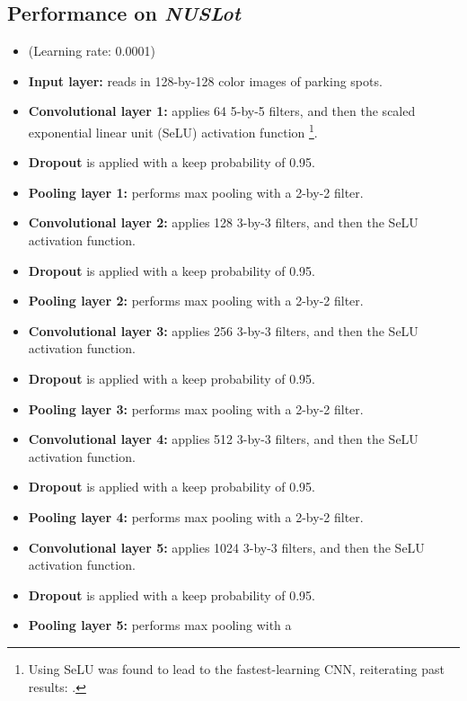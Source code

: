 \documentclass[a4paper, 11pt]{article} %
\begin{document}
	\subsection{Performance on \textit{NUSLot}}
		\begin{itemize}
			\setlength\itemsep{-3mm}
			\item[] (Learning rate: 0.0001)
			\item[] \textbf{Input layer:} reads in 128-by-128 color images of 
			parking spots.
			\item[] \textbf{Convolutional layer 1:} applies 64 5-by-5 filters, 
			and 
			then the 
			scaled exponential linear unit (SeLU) activation function 
			\footnote{Using SeLU was found to lead to the fastest-learning CNN, 
			reiterating past results: \cite{selu-motivation}\relax.}.
			\item[] \textbf{Dropout} is applied with a keep probability of 0.95.
			\item[] \textbf{Pooling layer 1:} performs max pooling with a 
			2-by-2 
			filter.
			\item[] \textbf{Convolutional layer 2:} applies 128 3-by-3 filters, 
			and 
			then the 
			SeLU activation function.
			\item[] \textbf{Dropout} is applied with a keep probability of 0.95.
			\item[] \textbf{Pooling layer 2:} performs max pooling with a 
			2-by-2 
			filter.
			\item[] \textbf{Convolutional layer 3:} applies 256 3-by-3 filters, 
			and 
			then the 
			SeLU activation function.
			\item[] \textbf{Dropout} is applied with a keep probability of 0.95.
			\item[] \textbf{Pooling layer 3:} performs max pooling with a 
			2-by-2 
			filter.
			\item[] \textbf{Convolutional layer 4:} applies 512 3-by-3 filters, 
			and 
			then the 
			SeLU activation function.
			\item[] \textbf{Dropout} is applied with a keep probability of 0.95.
			\item[] \textbf{Pooling layer 4:} performs max pooling with a 
			2-by-2 
			filter.
			\item[] \textbf{Convolutional layer 5:} applies 1024 3-by-3 
			filters, 
			and then 
			the SeLU activation function.
			\item[] \textbf{Dropout} is applied with a keep probability of 0.95.
			\item[] \textbf{Pooling layer 5:} performs max pooling with a 

\end{itemize}
\end{document}
